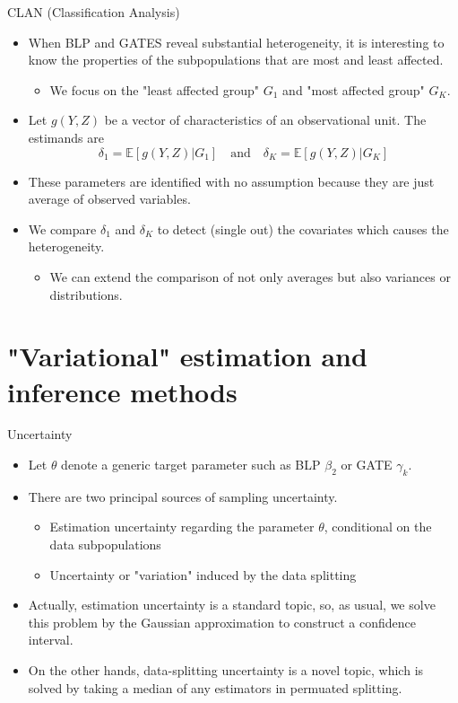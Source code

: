 \documentclass[xcolor=svgnames,aspectratio=169]{beamer}
\newcommand{\E}{\mathbb{E}}
\begin{document}
\begin{frame}{CLAN (Classification Analysis)}
    \begin{itemize}
        \item When BLP and GATES reveal substantial heterogeneity, it is interesting to know \alert{the properties of the subpopulations} that are most and least affected.
        \begin{itemize}
            \item We focus on the "least affected group" $G_1$ and "most affected group" $G_K$.
        \end{itemize}
        \item Let $g(Y,Z)$ be a vector of characteristics of an observational unit. The estimands are 
        \[
        \delta_1=\E[g(Y,Z)|G_1]\quad \text{and}\quad\delta_K=\E[g(Y,Z)|G_K]
        \]
        \item These parameters are identified with no assumption because they are just average of observed variables.
        \item We compare $\delta_1$ and $\delta_K$ to detect (single out) the covariates which causes the heterogeneity.
        \begin{itemize}
            \item We can extend the comparison of not only averages but also variances or distributions.
        \end{itemize}
    \end{itemize}
\end{frame}

\section{"Variational" estimation and inference methods}

\begin{frame}{Uncertainty}
    \begin{itemize}
        \item Let $\theta$ denote a generic target parameter such as BLP $\beta_2$ or GATE $\gamma_k$.
        \item There are two principal sources of sampling uncertainty.
        \begin{itemize}
            \item \alert{Estimation uncertainty} regarding the parameter $\theta$, conditional on the data subpopulations
            \item Uncertainty or "variation" \alert{induced by the data splitting}
        \end{itemize}
        \item Actually, estimation uncertainty is a standard topic, so, as usual, we solve this problem by the \alert{Gaussian approximation} to construct a confidence interval.
        \item On the other hands, data-splitting uncertainty is a novel topic, which is solved by taking a \alert{median} of any estimators in permuated splitting. 
    \end{itemize}
\end{frame}
\end{document}
